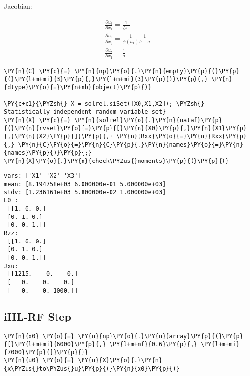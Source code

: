 Jacobian:

\[\begin{array}{l}
\frac{\partial u_{0}}{\partial x_{0}}=\frac{1}{\zeta x_{0}} \\
\frac{\partial u_{1}}{\partial x_{1}}=\frac{1}{\phi\left(u_{1}\right)} \frac{1}{b-a} \\
\frac{\partial u_{2}}{\partial x_{2}}=\frac{1}{\sigma}
\end{array}\]

    \begin{tcolorbox}[breakable, size=fbox, boxrule=1pt, pad at break*=1mm,colback=cellbackground, colframe=cellborder]
\begin{Verbatim}[commandchars=\\\{\}]
\PY{n}{C} \PY{o}{=} \PY{n}{np}\PY{o}{.}\PY{n}{empty}\PY{p}{(}\PY{p}{(}\PY{l+m+mi}{3}\PY{p}{,}\PY{l+m+mi}{3}\PY{p}{)}\PY{p}{,} \PY{n}{dtype}\PY{o}{=}\PY{n+nb}{object}\PY{p}{)}

\PY{c+c1}{\PYZsh{} X = solrel.siSet([X0,X1,X2]); \PYZsh{} Statistically independent random variable set}
\PY{n}{X} \PY{o}{=} \PY{n}{solrel}\PY{o}{.}\PY{n}{nataf}\PY{p}{(}\PY{n}{rvset}\PY{o}{=}\PY{p}{[}\PY{n}{X0}\PY{p}{,}\PY{n}{X1}\PY{p}{,}\PY{n}{X2}\PY{p}{]}\PY{p}{,} \PY{n}{Rxx}\PY{o}{=}\PY{n}{Rxx}\PY{p}{,} \PY{n}{C}\PY{o}{=}\PY{n}{C}\PY{p}{,}\PY{n}{names}\PY{o}{=}\PY{n}{names}\PY{p}{)}\PY{p}{;}
\PY{n}{X}\PY{o}{.}\PY{n}{check\PYZus{}moments}\PY{p}{(}\PY{p}{)}
\end{Verbatim}
\end{tcolorbox}

    \begin{Verbatim}[commandchars=\\\{\}]
vars: ['X1' 'X2' 'X3']
mean: [8.194758e+03 6.000000e-01 5.000000e+03]
stdv: [1.236161e+03 5.800000e-02 1.000000e+03]
L0 :
 [[1. 0. 0.]
 [0. 1. 0.]
 [0. 0. 1.]]
Rzz:
 [[1. 0. 0.]
 [0. 1. 0.]
 [0. 0. 1.]]
Jxu:
 [[1215.    0.    0.]
 [   0.    0.    0.]
 [   0.    0. 1000.]]
    \end{Verbatim}

    \hypertarget{ihl-rf-step}{%
\subsection{iHL-RF Step}\label{ihl-rf-step}}

    \begin{tcolorbox}[breakable, size=fbox, boxrule=1pt, pad at break*=1mm,colback=cellbackground, colframe=cellborder]
\begin{Verbatim}[commandchars=\\\{\}]
\PY{n}{x0} \PY{o}{=} \PY{n}{np}\PY{o}{.}\PY{n}{array}\PY{p}{(}\PY{p}{[}\PY{l+m+mi}{6000}\PY{p}{,} \PY{l+m+mf}{0.6}\PY{p}{,} \PY{l+m+mi}{7000}\PY{p}{]}\PY{p}{)}
\PY{n}{u0} \PY{o}{=} \PY{n}{X}\PY{o}{.}\PY{n}{x\PYZus{}to\PYZus{}u}\PY{p}{(}\PY{n}{x0}\PY{p}{)}
\end{Verbatim}
\end{tcolorbox}

